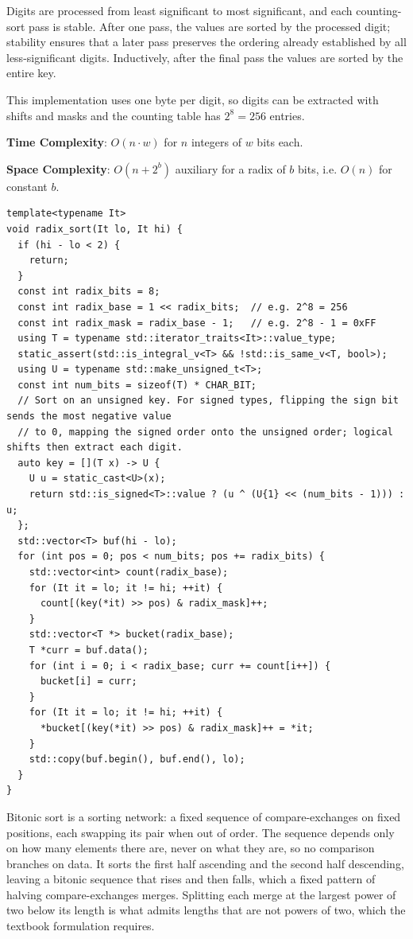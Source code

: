 Digits are processed from least significant to most significant, and each counting-sort pass is stable. After one pass, the values are sorted by the processed digit; stability ensures that a later pass preserves the ordering already established by all less-significant digits. Inductively, after the final pass the values are sorted by the entire key.

This implementation uses one byte per digit, so digits can be extracted with shifts and masks and the counting table has $2^8 = 256$ entries.

\textbf{Time Complexity}: $O(n \cdot w)$ for $n$ integers of $w$ bits each.

\textbf{Space Complexity}: $O(n + 2^{b})$ auxiliary for a radix of $b$ bits, i.e. $O(n)$ for constant $b$.

\begin{lstlisting}[style=cpp]
template<typename It>
void radix_sort(It lo, It hi) {
  if (hi - lo < 2) {
    return;
  }
  const int radix_bits = 8;
  const int radix_base = 1 << radix_bits;  // e.g. 2^8 = 256
  const int radix_mask = radix_base - 1;   // e.g. 2^8 - 1 = 0xFF
  using T = typename std::iterator_traits<It>::value_type;
  static_assert(std::is_integral_v<T> && !std::is_same_v<T, bool>);
  using U = typename std::make_unsigned_t<T>;
  const int num_bits = sizeof(T) * CHAR_BIT;
  // Sort on an unsigned key. For signed types, flipping the sign bit sends the most negative value
  // to 0, mapping the signed order onto the unsigned order; logical shifts then extract each digit.
  auto key = [](T x) -> U {
    U u = static_cast<U>(x);
    return std::is_signed<T>::value ? (u ^ (U{1} << (num_bits - 1))) : u;
  };
  std::vector<T> buf(hi - lo);
  for (int pos = 0; pos < num_bits; pos += radix_bits) {
    std::vector<int> count(radix_base);
    for (It it = lo; it != hi; ++it) {
      count[(key(*it) >> pos) & radix_mask]++;
    }
    std::vector<T *> bucket(radix_base);
    T *curr = buf.data();
    for (int i = 0; i < radix_base; curr += count[i++]) {
      bucket[i] = curr;
    }
    for (It it = lo; it != hi; ++it) {
      *bucket[(key(*it) >> pos) & radix_mask]++ = *it;
    }
    std::copy(buf.begin(), buf.end(), lo);
  }
}
\end{lstlisting}
Bitonic sort is a sorting network: a fixed sequence of compare-exchanges on fixed positions, each swapping its pair when out of order. The sequence depends only on how many elements there are, never on what they are, so no comparison branches on data. It sorts the first half ascending and the second half descending, leaving a bitonic sequence that rises and then falls, which a fixed pattern of halving compare-exchanges merges. Splitting each merge at the largest power of two below its length is what admits lengths that are not powers of two, which the textbook formulation requires.

